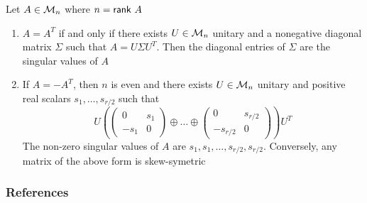 \documentclass[aspectratio=169]{beamer}
\begin{document}
\begin{frame}
\begin{theorem}
	Let $A\in \mathcal{M}_n$ where $n= \mathsf{rank}\ A$
	\begin{enumerate}
		\item $A= A^T$ if and only if there exists $U \in \mathcal{M}_n$ unitary and a nonegative diagonal matrix $\Sigma$ such that $A= U \Sigma U^T$. Then the diagonal entries of $\Sigma$ are the singular values of $A$
		\item If $A=-A^T$, then $n$ is even and there exists $U \in \mathcal{M}_n$ unitary and positive real scalars $s_1, \dots , s_{r/2}$ such that 
		\[
			U \left( \begin{pmatrix}
			0& s_1\\
			-s_1& 0
			\end{pmatrix} \oplus \dots \oplus 
			\begin{pmatrix}
			0& s_{r/2}\\
			-s_{r/2}& 0
			\end{pmatrix}\right)U^T
		\]
		The non-zero singular values of $A$ are $s_1,s_1,  \dots, s_{r/2}, s_{r/2}$.
		Conversely, any matrix of the above form is skew-symetric
	\end{enumerate}
\end{theorem}
\end{frame}


\begin{frame}[allowframebreaks]
	\frametitle{References}
	
	
\end{frame}
	
\end{document}
